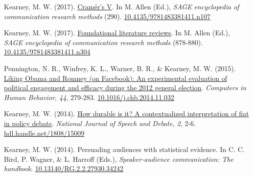 \begin{bibenum}
\item[] Kearney, M. W. (2017).
\href{http://mikewk.com/cramersv.pdf}{Cram\'{e}r's V}.
In M. Allen (Ed.),
\textit{SAGE encyclopedia of communication research methods} (290).
\href{http://dx.doi.org/10.4135/9781483381411.n107}{10.4135/9781483381411.n107}

\item[] Kearney, M. W. (2017).
\href{http://mikewk.com/flr.pdf}{Foundational literature reviews}.
In M. Allen (Ed.),
\textit{SAGE encyclopedia of communication research methods} (878-880).
\href{http://dx.doi.org/10.4135/9781483381411.n304}{10.4135/9781483381411.n304}

\item Pennington, N. R., Winfrey, K. L., Warner, B. R., \& Kearney, M. W. (2015).
\href{http://www.researchgate.net/publication/269728178_Liking_Obama_and_Romney_(on_Facebook)_An_experimental_evaluation_of_political_engagement_and_efficacy_during_the_2012_general_election}{Liking Obama and Romney (on Facebook): An experimental evaluation of political engagement and efficacy during the 2012 general election}.
\textit{Computers in Human Behavior, 44}, 279-283.
\href{https://doi.org/10.1016/j.chb.2014.11.032}{10.1016/j.chb.2014.11.032}

\item Kearney, M. W. (2014).
\href{http://ssrn.com/abstract=2618298}{How durable is it? A contextualized interpretation of fiat in policy debate}.
\textit{National Journal of Speech and Debate, 2}, 2-6.
\href{http://hdl.handle.net/1808/15009}{hdl.handle.net/1808/15009}

\item Kearney, M. W. (2014). Persuading audiences with statistical evidence.
In C. C. Bird, P. Wagner, \& L. Harroff (Eds.),
\textit{Speaker-audience communication: The handbook}.
\href{https://dx.doi.org/10.13140/RG.2.2.27930.34242}{10.13140/RG.2.2.27930.34242}

\end{bibenum}
